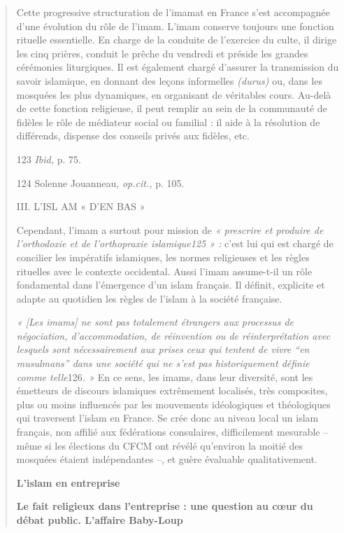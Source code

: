 \begin{quote}
Cette progressive structuration de l'imamat en France s'est accompagnée
d'une évolution du rôle de l'imam. L'imam conserve toujours une fonction
rituelle essentielle. En charge de la conduite de l'exercice du culte,
il dirige les cinq prières, conduit le prêche du vendredi et préside les
grandes cérémonies liturgiques. Il est également chargé d'assurer la
transmission du savoir islamique, en donnant des leçons informelles
\emph{(durus)} ou, dans les mosquées les plus dynamiques, en organisant
de véritables cours. Au-delà de cette fonction religieuse, il peut
remplir au sein de la communauté de fidèles le rôle de médiateur social
ou familial : il aide à la résolution de différends, dispense des
conseils privés aux fidèles, etc.

123 \emph{Ibid,} p. 75.

124 Solenne Jouanneau, \emph{op.cit.,} p. 105.

III. L'ISL AM « D'EN BAS »

Cependant, l'imam a surtout pour mission de \emph{« prescrire et
produire de l'orthodoxie et de l'orthopraxie islamique125 » :} c'est lui
qui est chargé de concilier les impératifs islamiques, les normes
religieuses et les règles rituelles avec le contexte occidental. Aussi
l'imam assume-t-il un rôle fondamental dans l'émergence d'un islam
français. Il définit, explicite et adapte au quotidien les règles de
l'islam à la société française.

\emph{« {[}Les imams{]} ne sont pas totalement étrangers aux processus
de négociation, d'accommodation, de réinvention ou de réinterprétation
avec lesquels sont nécessairement aux prises ceux qui tentent de vivre
``en musulmans'' dans une société qui ne s'est pas historiquement
définie comme telle}126\emph{. »} En ce sens, les imams, dans leur
diversité, sont les émetteurs de discours islamiques extrêmement
localisés, très composites, plus ou moins influencés par les mouvements
idéologiques et théologiques qui traversent l'islam en France. Se crée
donc au niveau local un islam français, non affilié aux fédérations
consulaires, difficilement mesurable -- même si les élections du CFCM
ont révélé qu'environ la moitié des mosquées étaient indépendantes --,
et guère évaluable qualitativement.

\textbf{L'islam en entreprise}

\textbf{Le fait religieux dans l'entreprise : une question au cœur du
débat public. L'affaire Baby-Loup}
\end{quote}

